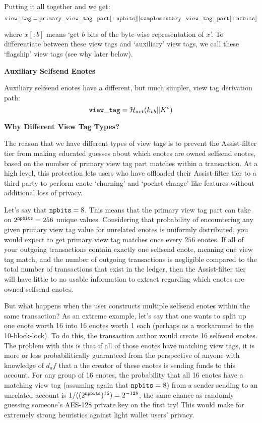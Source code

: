 Putting it all together and we get:
\[ {\tt view\_tag} = {\tt primary\_view\_tag\_part}[\\:{\tt npbits}] || {\tt complementary\_view\_tag\_part}[\\:{\tt ncbits}] \]

where $x[:{b}]$ means `get $b$ bits of the byte-wise representation of $x$'. To differentiate between these view tags and `auxiliary' view tags, we call these `flagship' view tags (see why later below).


\textbf{Auxiliary Selfsend Enotes}

Auxiliary selfsend enotes have a different, but much simpler, view tag derivation path:
\[ {\tt view\_tag} = \mathcal{H}_{avt}(k_{vb} || K^o) \]


\textbf{Why Different View Tag Types?}

The reason that we have different types of view tags is to prevent the Assist-filter tier from making educated guesses about which enotes are owned selfsend enotes, based on the number of primary view tag part matches within a transaction. At a high level, this protection lets users who have offloaded their Assist-filter tier to a third party to perform enote `churning' and `pocket change'-like features without additional loss of privacy.

Let's say that ${\tt npbits} = 8$. This means that the primary view tag part can take on $2^{\tt npbits} = 256$ unique values. Considering that probability of encountering any given primary view tag value for unrelated enotes is uniformly distributed, you would expect to get primary view tag matches once every $256$ enotes. If all of your outgoing transactions contain exactly one selfsend enote, meaning one view tag match, and the number of outgoing transactions is negligible compared to the total number of transactions that exist in the ledger, then the Assist-filter tier will have little to no usable information to extract regarding which enotes are owned selfsend enotes.

But what happens when the user constructs multiple selfsend enotes within the same transaction? As an extreme example, let's say that one wants to split up one enote worth 16 into 16 enotes worth 1 each (perhaps as a workaround to the 10-block-lock). To do this, the transaction author would create 16 selfsend enotes. The problem with this is that if all of those enotes have matching view tags, it is more or less probabilitically guaranteed from the perspective of anyone with knowledge of $d_af$ that a the creator of these enotes is sending funds to this account. For any group of 16 enotes, the probability that all 16 enotes have a matching view tag (assuming again that ${\tt npbits}=8$) from a sender sending to an unrelated account is 
$1 / ((2^{\tt npbits})^{16}) = 2^{-128}$, the same chance as randomly guessing someone's AES-128 private key on the first try! This would make for extremely strong heuristics against light wallet users' privacy.

